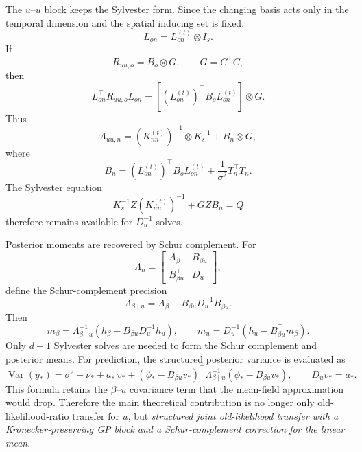 \documentclass[12pt]{article}
\newcommand{\Var}{\operatorname{Var}}
\begin{document}
The $u$--$u$ block keeps the Sylvester form. Since the changing basis acts only in the
temporal dimension and the spatial inducing set is fixed,
\begin{equation}
    L_{on}=L_{on}^{(t)}\otimes I_s.
\end{equation}
If
\begin{equation}
    R_{uu,o}=B_o\otimes G,
    \qquad
    G=C^\top C,
\end{equation}
then
\begin{equation}
    L_{on}^\top R_{uu,o}L_{on}
    =
    \left[(L_{on}^{(t)})^\top B_oL_{on}^{(t)}\right]\otimes G.
\end{equation}
Thus
\begin{equation}
    \Lambda_{uu,n}
    =
    (K_{nn}^{(t)})^{-1}\otimes K_s^{-1}+B_n\otimes G,
\end{equation}
where
\begin{equation}
    B_n=(L_{on}^{(t)})^\top B_oL_{on}^{(t)}+\frac{1}{\sigma^2}T_n^\top T_n.
\end{equation}
The Sylvester equation
\begin{equation}
    K_s^{-1}Z(K_{nn}^{(t)})^{-1}+GZB_n=Q
\end{equation}
therefore remains available for $D_u^{-1}$ solves.

Posterior moments are recovered by Schur complement. For
\begin{equation}
    \Lambda_n=
    \begin{bmatrix}
        A_\beta & B_{\beta u}\\
        B_{\beta u}^\top & D_u
    \end{bmatrix},
\end{equation}
define the Schur-complement precision
\begin{equation}
    \Lambda_{\beta\mid u}=A_\beta-B_{\beta u}D_u^{-1}B_{\beta u}^\top.
\end{equation}
Then
\begin{equation}
    m_\beta=\Lambda_{\beta\mid u}^{-1}(h_\beta-B_{\beta u}D_u^{-1}h_u),
    \qquad
    m_u=D_u^{-1}(h_u-B_{\beta u}^\top m_\beta).
\end{equation}
Only $d+1$ Sylvester solves are needed to form the Schur complement and posterior means.
For prediction, the structured posterior variance is evaluated as
\begin{equation}
    \Var(y_*)
    =
    \sigma^2+\nu_*+a_*^\top v_*
    +
    (\phi_*-B_{\beta u}v_*)^\top \Lambda_{\beta\mid u}^{-1}(\phi_*-B_{\beta u}v_*),
    \qquad
    D_uv_*=a_*.
\end{equation}
This formula retains the $\beta$--$u$ covariance term that the mean-field approximation
would drop. Therefore the main theoretical contribution is no longer only
old-likelihood-ratio transfer for $u$, but \emph{structured joint old-likelihood transfer
with a Kronecker-preserving GP block and a Schur-complement correction for the linear
mean}.
\end{document}

